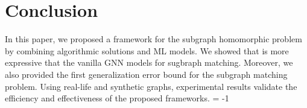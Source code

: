 \section{Conclusion}
In this paper, we proposed a framework \HFrame
for the subgraph homomorphic problem
by combining algorithmic solutions
and ML models.
We showed that \HFrame is more expressive
that the vanilla GNN models for sugbraph matching.
Moreover, we also provided the first generalization 
error
bound for the subgraph matching problem.
Using real-life and synthetic graphs, 
experimental results validate the efficiency
and effectiveness of the proposed frameworks.
\looseness = -1


